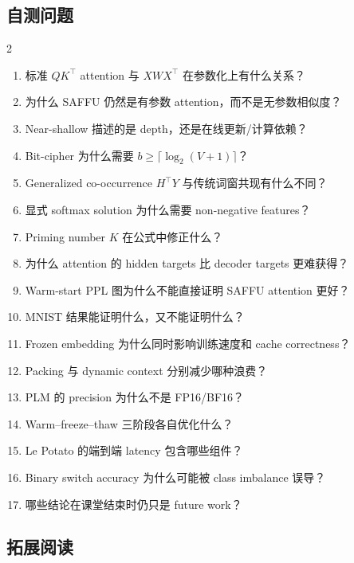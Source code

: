 \documentclass[a4paper]{article}
\begin{document}
\subsection{自测问题}

\begin{multicols}{2}
\small
\begin{enumerate}
  \item 标准 $QK^\top$ attention 与 $XWX^\top$ 在参数化上有什么关系？
  \item 为什么 SAFFU 仍然是有参数 attention，而不是无参数相似度？
  \item Near-shallow 描述的是 depth，还是在线更新/计算依赖？
  \item Bit-cipher 为什么需要 $b\ge\lceil\log_2(V+1)\rceil$？
  \item Generalized co-occurrence $H^\top Y$ 与传统词窗共现有什么不同？
  \item 显式 softmax solution 为什么需要 non-negative features？
  \item Priming number $K$ 在公式中修正什么？
  \item 为什么 attention 的 hidden targets 比 decoder targets 更难获得？
  \item Warm-start PPL 图为什么不能直接证明 SAFFU attention 更好？
  \item MNIST 结果能证明什么，又不能证明什么？
  \item Frozen embedding 为什么同时影响训练速度和 cache correctness？
  \item Packing 与 dynamic context 分别减少哪种浪费？
  \item PLM 的 precision 为什么不是 FP16/BF16？
  \item Warm--freeze--thaw 三阶段各自优化什么？
  \item Le Potato 的端到端 latency 包含哪些组件？
  \item Binary switch accuracy 为什么可能被 class imbalance 误导？
  \item 哪些结论在课堂结束时仍只是 future work？
\end{enumerate}
\end{multicols}

\subsection{拓展阅读}
\end{document}
